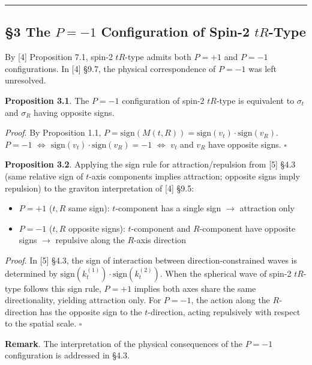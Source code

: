 \documentclass[
  a4paper,11pt]{article}
\providecommand{\tightlist}{%
  \setlength{\itemsep}{0pt}\setlength{\parskip}{0pt}}
\begin{document}
\begin{center}\rule{0.5\linewidth}{0.5pt}\end{center}

\subsection{\texorpdfstring{§3 The \(P = -1\) Configuration of Spin-2
\(tR\)-Type}{§3 The P = -1 Configuration of Spin-2 tR-Type}}\label{the-p--1-configuration-of-spin-2-tr-type}

By {[}4{]} Proposition 7.1, spin-2 \(tR\)-type admits both \(P = +1\)
and \(P = -1\) configurations. In {[}4{]} §9.7, the physical
correspondence of \(P = -1\) was left unresolved.

\textbf{Proposition 3.1}. The \(P = -1\) configuration of spin-2
\(tR\)-type is equivalent to \(\sigma_t\) and \(\sigma_R\) having
opposite signs.

\emph{Proof}. By Proposition 1.1,
\(P = \text{sign}(M(t, R)) = \text{sign}(v_t) \cdot \text{sign}(v_R)\).
\(P = -1\) \(\iff\) \(\text{sign}(v_t) \cdot \text{sign}(v_R) = -1\)
\(\iff\) \(v_t\) and \(v_R\) have opposite signs. \(\square\)

\textbf{Proposition 3.2}. Applying the sign rule for
attraction/repulsion from {[}5{]} §4.3 (same relative sign of \(t\)-axis
components implies attraction; opposite signs imply repulsion) to the
graviton interpretation of {[}4{]} §9.5:

\begin{itemize}
\tightlist
\item
  \(P = +1\) (\(t, R\) same sign): \(t\)-component has a single sign
  \(\to\) attraction only
\item
  \(P = -1\) (\(t, R\) opposite signs): \(t\)-component and
  \(R\)-component have opposite signs \(\to\) repulsive along the
  \(R\)-axis direction
\end{itemize}

\emph{Proof}. In {[}5{]} §4.3, the sign of interaction between
direction-constrained waves is determined by
\(\text{sign}(k_t^{(1)}) \cdot \text{sign}(k_t^{(2)})\). When the
spherical wave of spin-2 \(tR\)-type follows this sign rule, \(P = +1\)
implies both axes share the same directionality, yielding attraction
only. For \(P = -1\), the action along the \(R\)-direction has the
opposite sign to the \(t\)-direction, acting repulsively with respect to
the spatial scale. \(\square\)

\textbf{Remark}. The interpretation of the physical consequences of the
\(P = -1\) configuration is addressed in §4.3.
\end{document}
